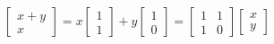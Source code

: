 \documentclass[preview]{standalone}
\begin{document}
\begin{align*}
\begin{bmatrix} x + y \\ x \end{bmatrix} = x\begin{bmatrix} 1 \\ 1 \end{bmatrix} + y\begin{bmatrix} 1 \\ 0 \end{bmatrix} = \begin{bmatrix} 1 & 1 \\ 1 & 0 \end{bmatrix}\begin{bmatrix} x \\ y \end{bmatrix}
\end{align*}
\end{document}
